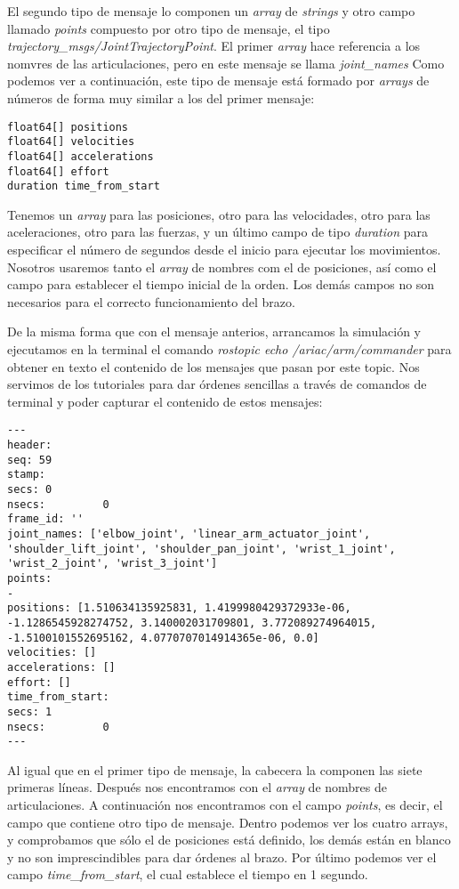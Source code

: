 El segundo tipo de mensaje lo componen un \textit{array} de \textit{strings} y otro campo llamado \textit{points} compuesto por otro tipo de mensaje, el tipo \textit{trajectory\_msgs/JointTrajectoryPoint}. El primer \textit{array} hace referencia a los nomvres de las articulaciones, pero en este mensaje se llama \textit{joint\_names} Como podemos ver a continuación, este tipo de mensaje está formado por \textit{arrays} de números de forma muy similar a los del primer mensaje:
\begin{lstlisting}
float64[] positions
float64[] velocities
float64[] accelerations
float64[] effort
duration time_from_start
\end{lstlisting}
Tenemos un \textit{array} para las posiciones, otro para las velocidades, otro para las aceleraciones, otro para las fuerzas, y un último campo de tipo \textit{duration} para especificar el número de segundos desde el inicio para ejecutar los movimientos. Nosotros usaremos tanto el \textit{array} de nombres com el de posiciones, así como el campo para establecer el tiempo inicial de la orden. Los demás campos no son necesarios para el correcto funcionamiento del brazo.

De la misma forma que con el mensaje anterios, arrancamos la simulación y ejecutamos en la terminal el comando \textit{rostopic echo /ariac/arm/commander} para obtener en texto el contenido de los mensajes que pasan por este topic. Nos servimos de los tutoriales para dar órdenes sencillas a través de comandos de terminal y poder capturar el contenido de estos mensajes:
\begin{lstlisting}
---
header: 
seq: 59
stamp: 
secs: 0
nsecs:         0
frame_id: ''
joint_names: ['elbow_joint', 'linear_arm_actuator_joint', 'shoulder_lift_joint', 'shoulder_pan_joint', 'wrist_1_joint', 'wrist_2_joint', 'wrist_3_joint']
points: 
- 
positions: [1.510634135925831, 1.4199980429372933e-06, -1.1286545928274752, 3.140002031709801, 3.772089274964015, -1.5100101552695162, 4.0770707014914365e-06, 0.0]
velocities: []
accelerations: []
effort: []
time_from_start: 
secs: 1
nsecs:         0
---
\end{lstlisting}
Al igual que en el primer tipo de mensaje, la cabecera la componen las siete primeras líneas. Después nos encontramos con el \textit{array} de nombres de articulaciones. A continuación nos encontramos con el campo \textit{points}, es decir, el campo que contiene otro tipo de mensaje. Dentro podemos ver los cuatro arrays, y comprobamos que sólo el de posiciones está definido, los demás están en blanco y no son imprescindibles para dar órdenes al brazo. Por último podemos ver el campo \textit{time\_from\_start}, el cual establece el tiempo en 1 segundo.

